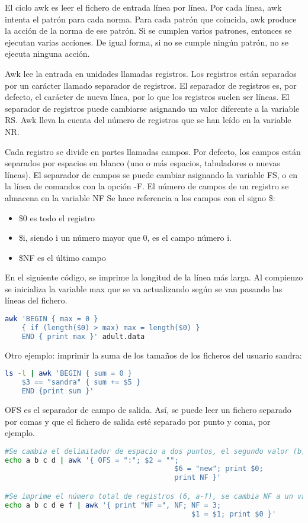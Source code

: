 El ciclo awk es leer el fichero de entrada línea por línea. Por cada línea, awk intenta el patrón para cada norma. Para cada patrón que coincida, awk produce la acción de la norma de ese patrón. Si se cumplen varios patrones, entonces se ejecutan varias acciones. De igual forma, si no se cumple ningún patrón, no se ejecuta ninguna acción.

Awk lee la entrada en unidades llamadas registros. Los registros están separados por un carácter llamado separador de registros. El separador de registros es, por defecto, el carácter de nueva línea, por lo que los registros suelen ser líneas. El separador de registros puede cambiarse asignando un valor diferente a la variable RS. Awk lleva la cuenta del número de registros que se han leído en la variable NR. 

Cada registro se divide en partes llamadas campos. Por defecto, los campos están separados por espacios en blanco (uno o más espacios, tabuladores o nuevas líneas). El separador de campos se puede cambiar asignando la variable FS, o en la línea de comandos con la opción -F. El número de campos de un registro se almacena en la variable NF Se hace referencia a los campos con el signo \$:
\begin{itemize}
\item \$0 es todo el registro
\item \$i, siendo i un número mayor que 0, es el campo número i.
\item \$NF es el último campo
\end{itemize}

En el siguiente código, se imprime la longitud de la línea más larga. Al compienzo se inicializa la variable max que se va actualizando según se van pasando las líneas del fichero.
\begin{lstlisting}[language=bash]
awk 'BEGIN { max = 0 }
	{ if (length($0) > max) max = length($0) }
	END { print max }' adult.data
\end{lstlisting}

Otro ejemplo: imprimir la suma de los tamaños de los ficheros del usuario sandra:
\begin{lstlisting}[language=bash]
ls -l | awk 'BEGIN { sum = 0 } 
	$3 == "sandra" { sum += $5 }
	END {print sum }'
\end{lstlisting}

OFS es el separador de campo de salida. Así, se puede leer un fichero separado por comas y que el fichero de salida esté separado por punto y coma, por ejemplo.
\begin{lstlisting}[language=bash]
#Se cambia el delimitador de espacio a dos puntos, el segundo valor (b) se reemplaza por un string vacío, se crea una sexta variable (nueva) con valor new, se imprime la línea y se imprime el número de registros.
echo a b c d | awk '{ OFS = ":"; $2 = "";
										$6 = "new"; print $0;
										print NF }'

#Se imprime el número total de registros (6, a-f), se cambia NF a un valor de 3 (a-c), se asigna a la variable 1 el valor de la variable 1 y se imprime toda la línea (que como se ha modificado NF a 3, la línea ya no es abcdef, si no solo abc).
echo a b c d e f | awk '{ print "NF =", NF; NF = 3;
											$1 = $1; print $0 }'
\end{lstlisting}